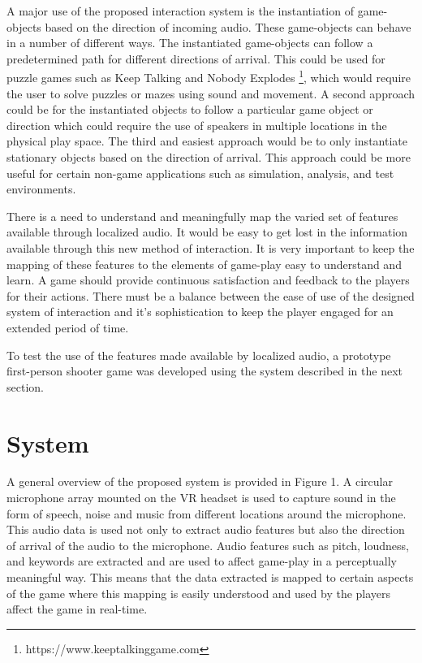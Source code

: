 \documentclass[convention]{aesconf}
\begin{document}
A major use of the proposed interaction system is the instantiation of game-objects based on the direction of incoming audio. These game-objects can behave in a number of different ways. The instantiated game-objects can follow a predetermined path for different directions of arrival. This could be used for puzzle games such as Keep Talking and Nobody Explodes \footnote{https://www.keeptalkinggame.com}, which would require the user to solve puzzles or mazes using sound and movement. A second approach could be for the instantiated objects to follow a particular game object or direction which could require the use of speakers in multiple locations in the physical play space. The third and easiest approach would be to only instantiate stationary objects based on the direction of arrival. This approach could be more useful for certain non-game applications such as simulation, analysis, and test environments. 

There is a need to understand and meaningfully map the varied set of features available through localized audio. It would be easy to get lost in the information available through this new method of interaction. It is very important to keep the mapping of these features to the elements of game-play easy to understand and learn. A game should provide continuous satisfaction and feedback to the players for their actions. There must be a balance between the ease of use of the designed system of interaction and it's sophistication to keep the player engaged for an extended period of time.

To test the use of the features made available by localized audio, a prototype first-person shooter game was developed using the system described in the next section.

\section{System}  

A general overview of the proposed system is provided in Figure 1. A circular microphone array mounted on the VR headset is used to capture sound in the form of speech, noise and music from different locations around the microphone. This audio data is used not only to extract audio features but also the direction of arrival of the audio to the microphone. Audio features such as pitch, loudness, and keywords are extracted and are used to affect game-play in a perceptually meaningful way. This means that the data extracted is mapped to certain aspects of the game where this mapping is easily understood and used by the players affect the game in real-time. 
\end{document}
